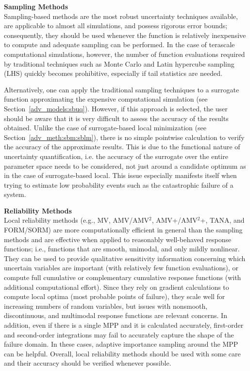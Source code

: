 {\bf Sampling Methods} \\
Sampling-based methods are the most robust uncertainty techniques
available, are applicable to almost all simulations, and possess
rigorous error bounds; consequently, they should be used whenever the
function is relatively inexpensive to compute and adequate sampling
can be performed. In the case of terascale computational simulations,
however, the number of function evaluations required by traditional
techniques such as Monte Carlo and Latin hypercube sampling (LHS)
quickly becomes prohibitive, especially if tail statistics are
needed. %

Alternatively, one can apply the traditional sampling techniques to a
surrogate function approximating the expensive computational
simulation (see Section~\ref{adv_models:sbuq}). However, if this
approach is selected, the user should be aware that it is very
difficult to assess the accuracy of the results obtained. Unlike
the case of surrogate-based local minimization (see
Section~\ref{adv_meth:sbm:sblm}), there is no simple pointwise calculation to
verify the accuracy of the approximate results. This is due to the
functional nature of uncertainty quantification, i.e. the accuracy of
the surrogate over the entire parameter space needs to be considered,
not just around a candidate optimum as in the case of surrogate-based
local. This issue especially manifests itself when trying to estimate
low probability events such as the catastrophic failure of a system.

{\bf Reliability Methods} \\
Local reliability methods (e.g., MV, AMV/AMV$^2$, AMV+/AMV$^2$+, TANA,
and FORM/SORM) are more computationally efficient in general than the
sampling methods and are effective when applied to reasonably
well-behaved response functions; i.e., functions that are smooth,
unimodal, and only mildly nonlinear. They can be used to provide
qualitative sensitivity information concerning which uncertain
variables are important (with relatively few function evaluations), or
compute full cumulative or complementary cumulative response functions
(with additional computational effort). Since they rely on gradient
calculations to compute local optima (most probable points of
failure), they scale well for increasing numbers of random variables,
but issues with nonsmooth, discontinuous, and multimodal response
functions are relevant concerns. In addition, even if there is a
single MPP and it is calculated accurately, first-order and
second-order integrations may fail to accurately capture the shape of
the failure domain. In these cases, adaptive importance sampling
around the MPP can be helpful. Overall, local reliability methods
should be used with some care and their accuracy should be verified
whenever possible.

